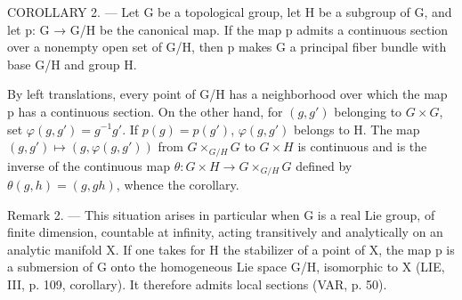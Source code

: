 COROLLARY 2. --- Let G be a topological group, let H be a subgroup of G, and let p: G → G/H be the canonical map. If the map p admits a continuous section over a nonempty open set of G/H, then p makes G a principal fiber bundle with base G/H and group H.

By left translations, every point of G/H has a neighborhood over which the map p has a continuous section. On the other hand, for \((g,g')\) belonging to \(G\times G\), set \(\varphi(g,g')=g^{-1}g'\). If \(p(g)=p(g')\), \(\varphi(g,g')\) belongs to H. The map \((g,g')\mapsto(g,\varphi(g,g'))\) from \(G\times_{G/H}G\) to \(G\times H\) is continuous and is the inverse of the continuous map \(\theta: G\times H\to G\times_{G/H}G\) defined by \(\theta(g,h)=(g,gh)\), whence the corollary.

Remark 2. --- This situation arises in particular when G is a real Lie group, of finite dimension, countable at infinity, acting transitively and analytically on an analytic manifold X. If one takes for H the stabilizer of a point of X, the map p is a submersion of G onto the homogeneous Lie space G/H, isomorphic to X (LIE, III, p. 109, corollary). It therefore admits local sections (VAR, p. 50).
